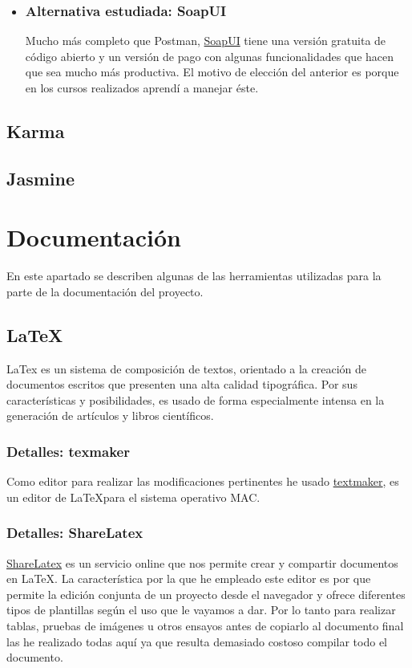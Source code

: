 \begin{itemize}
	\item	\subsubsection{Alternativa estudiada: SoapUI}
	Mucho más completo que Postman, \href{https://www.soapui.org/}{SoapUI} tiene una versión gratuita de código abierto y un versión de pago con algunas funcionalidades que hacen que sea mucho más productiva. El motivo de elección del anterior es porque en los cursos realizados aprendí a manejar éste.

\end{itemize}

\subsection{Karma}\label{karma}


\subsection{Jasmine}\label{jasmine}


\section{Documentación}\label{docs}
En este apartado se describen algunas de las herramientas utilizadas para la parte de la documentación del proyecto.

 \subsection{La\TeX}\label{docs_latex}
  LaTex es un sistema de composición de textos, orientado a la creación de documentos escritos que presenten una alta calidad tipográfica. Por sus características y posibilidades, es usado de forma especialmente intensa en la generación de artículos y libros científicos. 
   \subsubsection{Detalles: texmaker}
   
   Como editor para realizar las modificaciones pertinentes he usado \href{http://www.xm1math.net/texmaker/}{textmaker}, es un editor de La\TeX para el sistema operativo MAC. 
  
   \subsubsection{Detalles: ShareLatex}
    \href{https://es.sharelatex.com/}{ShareLatex}  es un servicio online que nos permite crear y compartir documentos en La\TeX. La característica por la que he empleado este editor es por que  permite la edición conjunta de un proyecto desde el navegador y ofrece diferentes tipos de plantillas según el uso que le vayamos a dar. Por lo tanto para realizar tablas, pruebas de imágenes u otros ensayos antes de copiarlo al documento final las he realizado todas aquí ya que resulta demasiado costoso compilar todo el documento.
  
